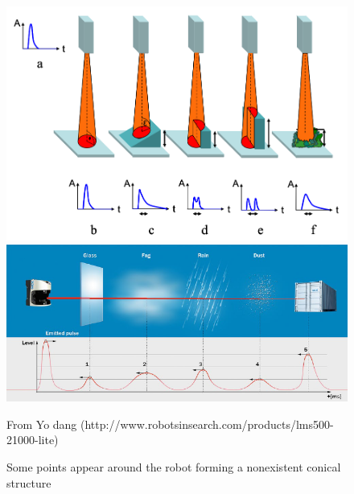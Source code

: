 \begin{figure}[htpb]
    \centering
    \includegraphics[width=0.8\linewidth]{img/chap_lidar/waveforms.png}
    \includegraphics[width=0.8\linewidth]{img/chap_lidar/waveforms2.png}
    \caption{ From \citet{lidar_figure1} Yo dang (http://www.robotsinsearch.com/products/lms500-21000-lite)}
    \label{fig:lidar_basics}
\end{figure}

\begin{figure}[htpb]
    \centering
    \caption{ Some points appear around the robot forming a nonexistent conical structure}
    \label{fig:shadow_points}
\end{figure}
